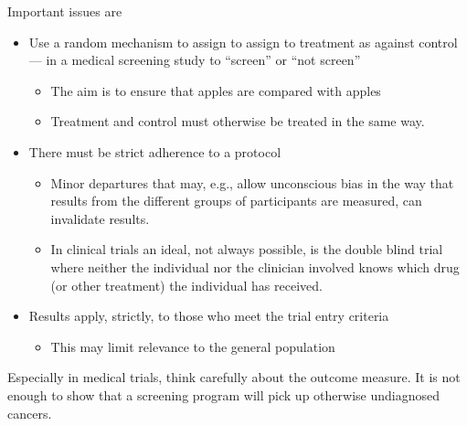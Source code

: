 \documentclass[
  10pt,
  b5paper]{book}
\providecommand{\tightlist}{%
  \setlength{\itemsep}{0pt}\setlength{\parskip}{0pt}}
\begin{document}
Important issues are

\begin{itemize}
\tightlist
\item
  Use a random mechanism to assign to assign to treatment as against
  control --- in a medical screening study to ``screen'' or ``not screen''

  \begin{itemize}
  \tightlist
  \item
    The aim is to ensure that apples are compared with apples
  \item
    Treatment and control must otherwise be treated in the same way.
  \end{itemize}
\item
  There must be strict adherence to a protocol

  \begin{itemize}
  \tightlist
  \item
    Minor departures that may, e.g., allow unconscious bias in the
    way that results from the different groups of participants are
    measured, can invalidate results.
  \item
    In clinical trials an ideal, not always possible, is the double
    blind trial where neither the individual nor the clinician
    involved knows which drug (or other treatment) the individual
    has received.
  \end{itemize}
\item
  Results apply, strictly, to those who meet the trial entry criteria

  \begin{itemize}
  \tightlist
  \item
    This may limit relevance to the general population
  \end{itemize}
\end{itemize}

Especially in medical trials, think carefully about the outcome measure.
It is not enough to show that a screening program will pick up otherwise
undiagnosed cancers.
\end{document}
